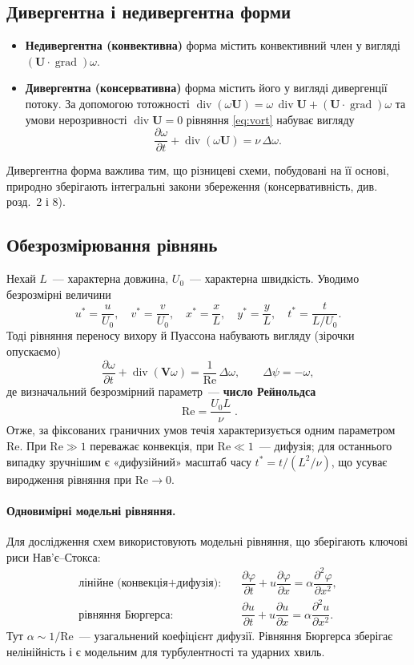 \documentclass[12pt,a4paper]{article}
\theoremstyle{definition}
\theoremstyle{plain}
\newcommand{\ddt}[1]{\dfrac{\partial #1}{\partial t}}
\newcommand{\ddx}[1]{\dfrac{\partial #1}{\partial x}}
\newcommand{\ddxx}[1]{\dfrac{\partial^2 #1}{\partial x^2}}
\DeclareMathOperator{\divv}{div}
\DeclareMathOperator{\grad}{grad}
\begin{document}
\subsection{Дивергентна і недивергентна форми}
\begin{itemize}[leftmargin=1.4em]
  \item \textbf{Недивергентна (конвективна)} форма містить конвективний
  член у вигляді $(\mathbf{U}\cdot\grad)\omega$.
  \item \textbf{Дивергентна (консервативна)} форма містить його у вигляді
  дивергенції потоку. За допомогою тотожності
  $\divv(\omega\mathbf{U})=\omega\,\divv\mathbf{U}+(\mathbf{U}\cdot\grad)\omega$
  та умови нерозривності $\divv\mathbf{U}=0$ рівняння \eqref{eq:vort}
  набуває вигляду
  \begin{equation}
     \ddt{\omega}+\divv(\omega\mathbf{U})=\nu\,\Delta\omega .
  \end{equation}
\end{itemize}
Дивергентна форма важлива тим, що різницеві схеми, побудовані на її
основі, природно зберігають інтегральні закони збереження
(консервативність, див. розд.~2 і 8).

\subsection{Обезрозмірювання рівнянь}
Нехай $L$~--- характерна довжина, $U_0$~--- характерна швидкість.
Уводимо безрозмірні величини
\[
  u^\ast=\frac{u}{U_0},\quad v^\ast=\frac{v}{U_0},\quad
  x^\ast=\frac{x}{L},\quad y^\ast=\frac{y}{L},\quad
  t^\ast=\frac{t}{L/U_0}.
\]
Тоді рівняння переносу вихору й Пуассона набувають вигляду (зірочки
опускаємо)
\begin{equation}
  \ddt{\omega}+\divv(\mathbf{V}\omega)=\frac{1}{\mathrm{Re}}\,\Delta\omega,
  \qquad \Delta\psi=-\omega,
\end{equation}
де визначальний безрозмірний параметр~--- \textbf{число Рейнольдса}
\begin{equation}
  \boxed{\;\mathrm{Re}=\dfrac{U_0 L}{\nu}\;}.
\end{equation}
Отже, за фіксованих граничних умов течія характеризується одним
параметром $\mathrm{Re}$. При $\mathrm{Re}\gg1$ переважає конвекція, при
$\mathrm{Re}\ll1$~--- дифузія; для останнього випадку зручнішим є
«дифузійний» масштаб часу $t^\ast=t/(L^2/\nu)$, що усуває виродження
рівняння при $\mathrm{Re}\to0$.

\paragraph{Одновимірні модельні рівняння.} Для дослідження схем
використовують модельні рівняння, що зберігають ключові риси
Нав'є--Стокса:
\begin{align}
  \text{лінійне (конвекція{+}дифузія):}\quad
    & \ddt{\varphi}+u\ddx{\varphi}=\alpha\ddxx{\varphi}, \label{eq:model}\\
  \text{рівняння Бюргерса:}\quad
    & \ddt{u}+u\ddx{u}=\alpha\ddxx{u}.
\end{align}
Тут $\alpha\sim1/\mathrm{Re}$~--- узагальнений коефіцієнт дифузії.
Рівняння Бюргерса зберігає нелінійність і є модельним для турбулентності
та ударних хвиль.
\end{document}
